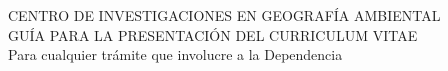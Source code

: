\documentclass[12pt]{report}
\begin{document}
\begin{center}
 CENTRO DE INVESTIGACIONES EN GEOGRAFÍA AMBIENTAL \\
GUÍA PARA LA PRESENTACIÓN DEL CURRICULUM VITAE \\
Para cualquier trámite que involucre a la Dependencia
\end{center}

\renewcommand{\labelenumi}{%
 \textbf{\theenumi}. }

\renewcommand{\theenumii}{\arabic{enumii}}
\renewcommand{\labelenumii}{%
    \textbf{\theenumi}.\theenumii. }

\renewcommand{\theenumiii}{\arabic{enumiii}}
\renewcommand{\labelenumiii}{%
    \textbf{\theenumi}.\theenumii.\theenumiii.}

\renewcommand{\labelitemi}{\tiny$\blacksquare$}
\renewcommand{\labelitemii}{\tiny$\blacksquare$}
\end{document}
